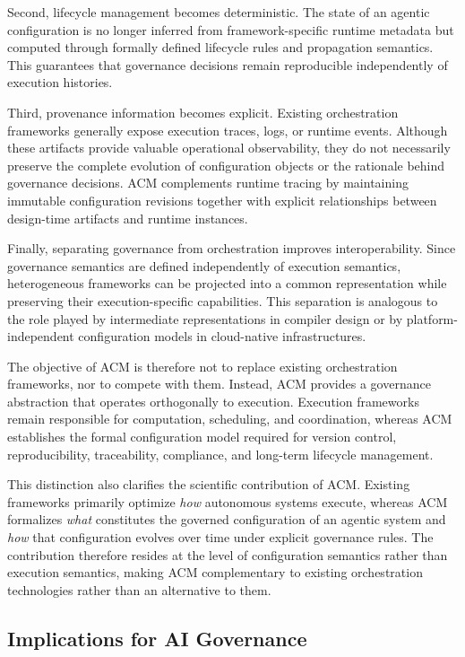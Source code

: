 \documentclass[10pt]{article}
\begin{document}
Second, lifecycle management becomes deterministic. The state of an agentic configuration is no longer inferred from framework-specific runtime metadata but computed through formally defined lifecycle rules and propagation semantics. This guarantees that governance decisions remain reproducible independently of execution histories.

Third, provenance information becomes explicit. Existing orchestration frameworks generally expose execution traces, logs, or runtime events. Although these artifacts provide valuable operational observability, they do not necessarily preserve the complete evolution of configuration objects or the rationale behind governance decisions. ACM complements runtime tracing by maintaining immutable configuration revisions together with explicit relationships between design-time artifacts and runtime instances.

Finally, separating governance from orchestration improves interoperability. Since governance semantics are defined independently of execution semantics, heterogeneous frameworks can be projected into a common representation while preserving their execution-specific capabilities. This separation is analogous to the role played by intermediate representations in compiler design or by platform-independent configuration models in cloud-native infrastructures.

The objective of ACM is therefore not to replace existing orchestration frameworks, nor to compete with them. Instead, ACM provides a governance abstraction that operates orthogonally to execution. Execution frameworks remain responsible for computation, scheduling, and coordination, whereas ACM establishes the formal configuration model required for version control, reproducibility, traceability, compliance, and long-term lifecycle management.

This distinction also clarifies the scientific contribution of ACM. Existing frameworks primarily optimize \emph{how} autonomous systems execute, whereas ACM formalizes \emph{what} constitutes the governed configuration of an agentic system and \emph{how} that configuration evolves over time under explicit governance rules. The contribution therefore resides at the level of configuration semantics rather than execution semantics, making ACM complementary to existing orchestration technologies rather than an alternative to them.

\subsection{Implications for AI Governance}
\end{document}
